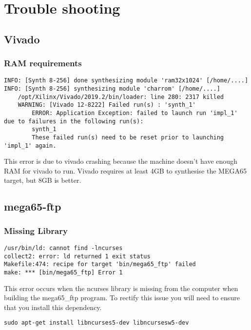\chapter{Trouble shooting}
    \section{Vivado}
    \subsection{RAM requirements}
    \begin{tcolorbox}[colback=black,coltext=white]
    \verbatimfont{\codefont}
    \begin{verbatim}
INFO: [Synth 8-256] done synthesizing module 'ram32x1024' [/home/....]
INFO: [Synth 8-256] synthesizing module 'charrom' [/home/....]
    /opt/Xilinx/Vivado/2019.2/bin/loader: line 280: 2317 killed
    WARNING: [Vivado 12-8222] Failed run(s) : 'synth_1'
        ERROR: Application Exception: failed to launch run 'impl_1' due to failures in the following run(s):
        synth_1
        These failed run(s) need to be reset prior to launching 'impl_1' again.
    \end{verbatim}
    \end{tcolorbox}
This error is due to vivado crashing because the machine doesn't have enough RAM for vivado to run.
Vivado requires at least 4GB to synthesise the MEGA65 target, but 8GB is better.

\section{mega65-ftp}
    \subsection{Missing Library}
    \begin{tcolorbox}[colback=black,coltext=white]
    \verbatimfont{\codefont}
    \begin{verbatim}
/usr/bin/ld: cannot find -lncurses
collect2: error: ld returned 1 exit status
Makefile:474: recipe for target 'bin/mega65_ftp' failed
make: *** [bin/mega65_ftp] Error 1
    \end{verbatim}
    \end{tcolorbox}
This error occurs when the ncurses library is missing from the computer when building the mega65_ftp program.
To rectify this issue you will need to ensure that you install this dependency.

    \begin{tcolorbox}[colback=black,coltext=white]
    \verbatimfont{\codefont}
    \begin{verbatim}
sudo apt-get install libncurses5-dev libncursesw5-dev
    \end{verbatim}
    \end{tcolorbox}
